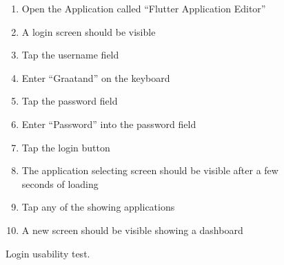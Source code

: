 \begin{figure}[H]
    \begin{enumerate}
        \item Open the Application called “Flutter Application Editor”
        \item A login screen should be visible
        \item Tap the username field
        \item Enter “Graatand” on the keyboard
        \item Tap the password field
        \item Enter “Password” into the password field
        \item Tap the login button
        \item The application selecting screen should be visible after a few seconds of loading
        \item Tap any of the showing applications
        \item A new screen should be visible showing a dashboard
    \end{enumerate}
    \caption{Login usability test.}
    \label{loginUsabilityTest}
\end{figure}

